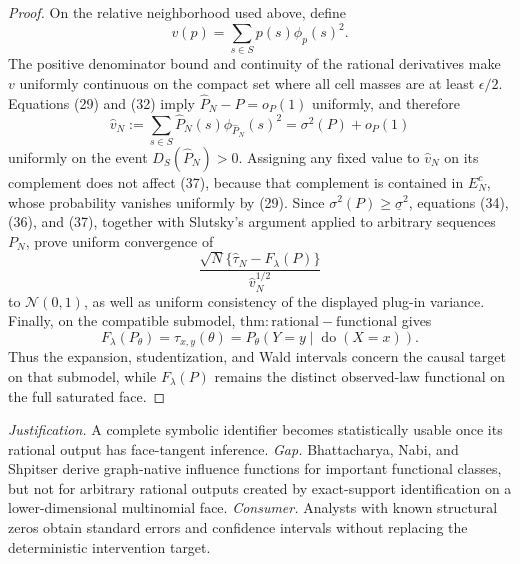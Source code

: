 \documentclass{article}
\begin{document}
\begin{proof}
On the relative neighborhood used above, define
\[
v(p)=\sum_{s\in S}p(s)\phi_p(s)^2.
\]
The positive denominator bound and continuity of the rational derivatives make \(v\) uniformly continuous on the compact set where all cell masses are at least \(\epsilon/2\).  Equations (29) and (32) imply \(\widehat P_N-P=o_P(1)\) uniformly, and therefore
\[
\widehat v_N
:=\sum_{s\in S}\widehat P_N(s)\phi_{\widehat P_N}(s)^2
=\sigma^2(P)+o_P(1)                                          \tag{37}
\]
uniformly on the event \(D_S(\widehat P_N)>0\).  Assigning any fixed value to \(\widehat v_N\) on its complement does not affect (37), because that complement is contained in \(E_N^c\), whose probability vanishes uniformly by (29).  Since \(\sigma^2(P)\ge\underline\sigma^2\), equations (34), (36), and (37), together with Slutsky's argument applied to arbitrary sequences \(P_N\), prove uniform convergence of
\[
\frac{\sqrt N\{\widehat\tau_N-F_\lambda(P)\}}
     {\widehat v_N^{1/2}}
\]
to \(\mathcal N(0,1)\), as well as uniform consistency of the displayed plug-in variance.  Finally, on the compatible submodel, \(\mathrm{thm:rational-functional}\) gives
\[
F_\lambda(P_\theta)=\tau_{x,y}(\theta)
=P_\theta(Y=y\mid\operatorname{do}(X=x)).
\]
Thus the expansion, studentization, and Wald intervals concern the causal target on that submodel, while \(F_\lambda(P)\) remains the distinct observed-law functional on the full saturated face.
\end{proof}
\par\smallskip\noindent \textit{Justification.} A complete symbolic identifier becomes statistically usable once its rational output has face-tangent inference. \textit{Gap.} Bhattacharya, Nabi, and Shpitser derive graph-native influence functions for important functional classes, but not for arbitrary rational outputs created by exact-support identification on a lower-dimensional multinomial face. \textit{Consumer.} Analysts with known structural zeros obtain standard errors and confidence intervals without replacing the deterministic intervention target.
\end{document}
